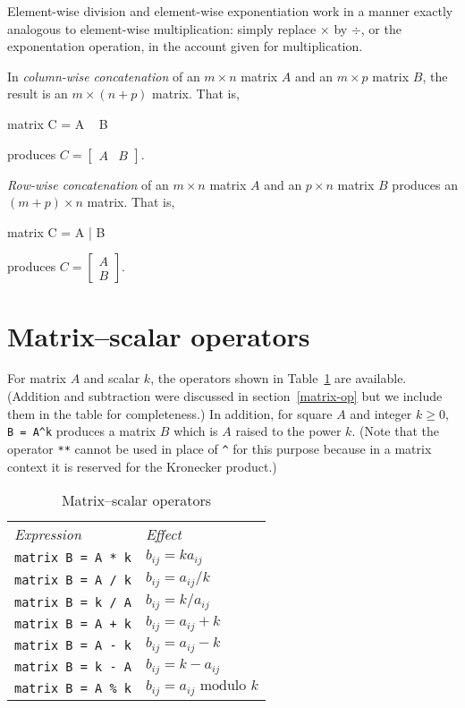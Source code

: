 Element-wise division and element-wise exponentiation work in a manner
exactly analogous to element-wise multiplication: simply replace
$\times$ by $\div$, or the exponentation operation, in the account
given for multiplication.

In \textit{column-wise concatenation} of an $m\times n$ matrix $A$ and
an $m\times p$ matrix $B$, the result is an $m\times (n+p)$ matrix.
That is,
%
\begin{code}
matrix C = A ~ B
\end{code}
% 
produces $C = \left[ \begin{array}{cc} A & B \end{array} \right]$.

\textit{Row-wise concatenation} of an $m\times n$ matrix $A$ and
an $p\times n$ matrix $B$ produces an $(m+p) \times n$ matrix.
That is,
%
\begin{code}
matrix C = A | B
\end{code}
% 
produces $C = \left[ \begin{array}{cc} A \\ B \end{array} \right]$.

\section{Matrix--scalar operators}
\label{matrix-scalar-op}

For matrix $A$ and scalar $k$, the operators shown in
Table~\ref{tab:matrix-scalar-ops} are available.  (Addition and
subtraction were discussed in section~\ref{matrix-op} but we include
them in the table for completeness.)  In addition, for square $A$ and
integer $k \geq 0$, \verb|B = A^k| produces a matrix $B$ which is $A$
raised to the power $k$.  (Note that the operator \texttt{**} cannot
be used in place of \verb|^| for this purpose because in a matrix
context it is reserved for the Kronecker product.)

\begin{table}[htbp]
\centering
\begin{tabular}{ll}
\textit{Expression} & \textit{Effect} \\[4pt]
\texttt{matrix B = A * k} & $b_{ij} = k a_{ij}$ \\
\texttt{matrix B = A / k} & $b_{ij} = a_{ij} / k$ \\
\texttt{matrix B = k / A} & $b_{ij} = k / a_{ij}$ \\
\texttt{matrix B = A + k} & $b_{ij} = a_{ij} + k$ \\
\texttt{matrix B = A - k} & $b_{ij} = a_{ij} - k$ \\
\texttt{matrix B = k - A} & $b_{ij} = k - a_{ij}$ \\
\texttt{matrix B = A \% k} & $b_{ij} = a_{ij} \mbox{ modulo } k$ \\
\end{tabular}
\caption{Matrix--scalar operators}
\label{tab:matrix-scalar-ops}
\end{table}


